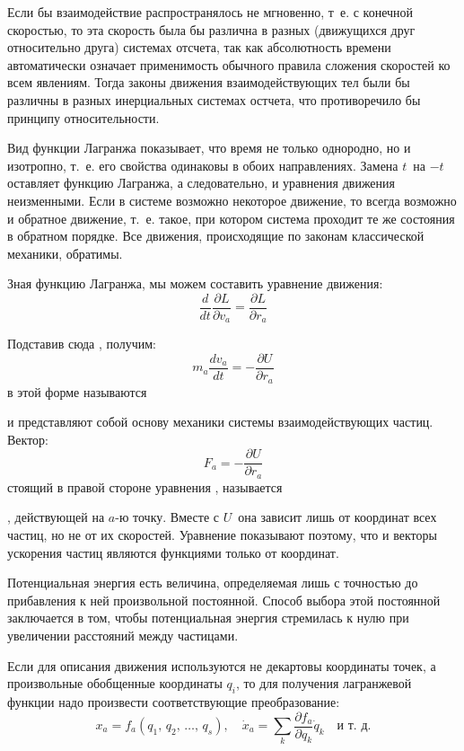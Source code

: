 Если бы взаимодействие распространялось не мгновенно, т~е. с конечной
скоростью, то эта скорость была бы различна в разных (движущихся друг
относительно друга) системах отсчета, так как абсолютность времени
автоматически означает применимость обычного правила сложения скоростей ко
всем явлениям. Тогда законы движения взаимодействующих тел были бы различны
в разных инерциальных системах остчета, что противоречило бы принципу
относительности.

Вид функции Лагранжа  показывает, что время не только однородно,
но и изотропно, т.~е. его свойства одинаковы в обоих направлениях.
Замена $t$\, на $-t$\, оставляет функцию Лагранжа, а следовательно, и
уравнения движения неизменными. Если в системе возможно некоторое движение,
то всегда возможно и обратное движение, т.~е. такое, при котором система
проходит те же состояния в обратном порядке. Все движения, происходящие по
законам классической механики, обратимы.

Зная функцию Лагранжа, мы можем составить уравнение движения:
\begin{equation}\label{mech19}
\frac{d}{dt} \frac{\partial L}{\partial v_a} =
\frac{\partial L}{\partial r_a}
\end{equation}

Подставив сюда ,  получим:
\begin{equation}\label{mech20}
m_a\frac{dv_a}{dt} = - \frac{\partial U}{\partial r_a}
\end{equation}
 в этой форме называются 
\parbox{117.8pt}{}  и
представляют собой основу механики системы взаимодействующих частиц.
Вектор:
\begin{equation}\label{mech21}
F_a = -\frac{\partial U}{\partial r_a}
\end{equation}
стоящий в правой стороне уравнения , называется
\parbox{36.8pt}{},
действующей на  $a$-ю точку. Вместе с $U$\, она зависит лишь от координат
всех частиц, но не от их скоростей. Уравнение   показывают
поэтому, что и векторы ускорения частиц являются функциями только от
координат.

Потенциальная энергия есть величина, определяемая лишь с точностью до
прибавления к ней произвольной постоянной. Способ выбора этой постоянной
заключается в том, чтобы потенциальная энергия стремилась к нулю при
увеличении расстояний между частицами.

Если для описания движения используются не декартовы координаты точек, а
произвольные обобщенные координаты $q_i$,  то для получения лагранжевой
функции надо произвести соответствующие преобразование:
$$
x_a = f_a(q_1,\, q_2,\, \dotsc ,\, q_s),\quad
\dot{x}_a = \sum_k \frac{\partial f_a}{\partial q_k} \dot{q}_k\quad
\text{и т.~д.}
$$


